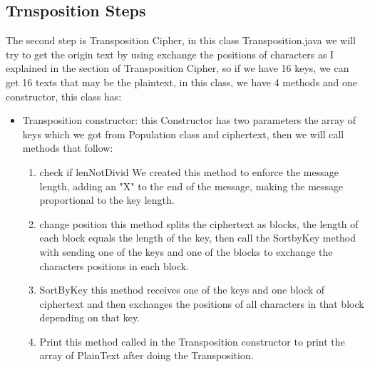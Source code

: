 \subsection{Trnsposition Steps}
The second step is Transposition Cipher, in this class Transposition.java we will try to get the origin text by using exchange the positions of characters as I explained in the section of Transposition Cipher, so if we have 16 keys, we can get 16 texts that may be the plaintext, in this class, we have 4 methods and one constructor, this class has:
\begin{itemize}
    \item{\textsf{Transposition constructor:} this Constructor has two parameters the array of keys which we got from Population class and ciphertext, then we will call methods that follow:}
\begin{enumerate}
    \item{\textsf{check if lenNotDivid} We created this method to enforce the message length, adding an "X" to the end of the message, making the message proportional to the key length.}
    \item{\textsf{change position} this method splits the ciphertext as blocks, the length of each block equals the length of the key, then call the SortbyKey method with sending one of the keys and one of the blocks to exchange the characters positions in each block.}
    \item{\textsf{SortByKey} this method receives one of the keys and one block of ciphertext and then exchanges the positions of all characters in that block depending on that key.}
    \item{\textsf{Print} this method called in the Transposition constructor to print the array of PlainText after doing the Transposition.}
\end{enumerate}
\end{itemize}


